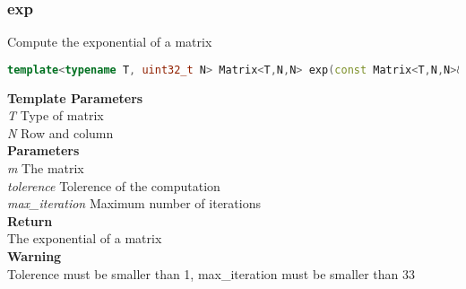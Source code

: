 \subsubsection{exp}
\begin{mdframed}
Compute the exponential of a matrix
\begin{lstlisting}[language=C++]
template<typename T, uint32_t N> Matrix<T,N,N> exp(const Matrix<T,N,N>& m, T tolerence = 1e-3, uint32_t max_iteration = 30) 
\end{lstlisting}
\textbf{Template Parameters} \\ 
\textit{T} Type of matrix \\ 
\textit{N} Row and column \\ 
\textbf{Parameters} \\ 
\textit{m} The matrix \\ 
\textit{tolerence} Tolerence of the computation \\ 
\textit{max\_iteration} Maximum number of iterations \\ 
\textbf{Return} \\ 
The exponential of a matrix\\ 
\textbf{Warning} \\ 
Tolerence must be smaller than 1, max\_iteration must be smaller than 33\\ 
\end{mdframed}

